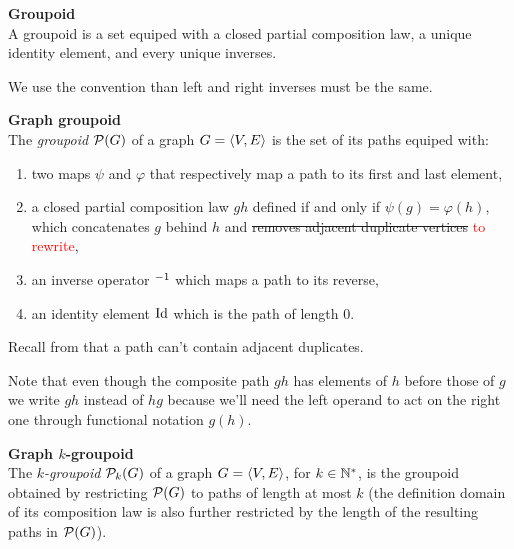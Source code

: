 \begin{definition}\textbf{Groupoid}\\
A groupoid is a set equiped with a closed partial composition law, a unique identity element, and every unique inverses.
\end{definition}

\begin{remark}We use the convention than left and right inverses must be the same.
\end{remark}

\begin{definition}\textbf{Graph groupoid}\\
The \emph{groupoid} $\cp(G)$ of a graph $\gve$ is the set of its paths equiped with:
\begin{enumerate}
\item two maps $\psi$ and $\varphi$ that respectively map a path to its first and last element,
\item a closed partial composition law $gh$ defined if and only if $\psi(g) = \varphi(h)$, which concatenates $g$ behind $h$ and \sout{removes adjacent duplicate vertices} \textcolor{red}{to rewrite},
\item an inverse operator $\h{0}^{-1}$ which maps a path to its reverse,
\item an identity element $\id$ which is the path of length $0$.
\end{enumerate}
\end{definition}

\begin{remark}Recall from  that a path can't contain adjacent duplicates.
\end{remark}

\begin{remark}Note that even though the composite path $gh$ has elements of $h$ before those of $g$ we write $gh$ instead of $hg$ because we'll need the left operand to act on the right one through functional notation $g(h)$.
\end{remark}

\begin{definition}\textbf{Graph $k$-groupoid}\\
The \emph{$k$-groupoid} $\cp_k(G)$ of a graph $\gve$, for $k \in \bbn^*$, is the groupoid obtained by restricting $\cp(G)$ to paths of length at most $k$ (the definition domain of its composition law is also further restricted by the length of the resulting paths in $\cp(G)$).
\end{definition}


